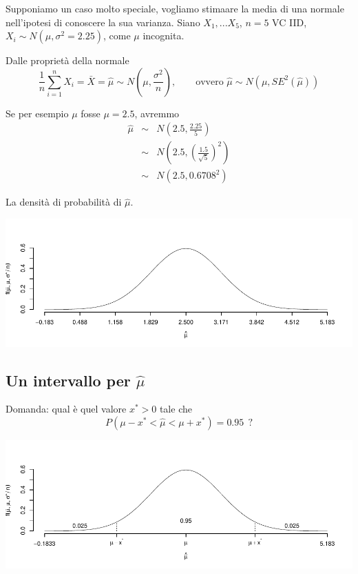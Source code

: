 \documentclass[
  11pt,
]{book}
\theoremstyle{mytheoremstyle}
\theoremstyle{mydefstyle}
\begin{document}
Supponiamo un caso molto speciale, vogliamo stimaare la media di una normale nell'ipotesi di conoscere la sua varianza. Siano \(X_1,...X_5\), \(n=5\) VC IID, \(X_i\sim N(\mu,\sigma^2=2.25)\), come \(\mu\) incognita.

Dalle proprietà della normale
\[\frac 1 n \sum_{i=1}^n X_i=\bar X=\hat\mu\sim N\left(\mu,\frac{\sigma^2}{n}\right), \qquad\text{ovvero }\hat \mu\sim N\left(\mu,SE^2(\hat \mu)\right) \]

Se per esempio \(\mu\) fosse \(\mu=2.5\), avremmo
\begin{eqnarray*}
\hat \mu &\sim& N\left(2.5,\frac{2.25}{5}\right)\\
       &\sim& N\left(2.5,\left(\frac{1.5}{\sqrt{5}}\right)^2\right)\\
       &\sim& N\left(2.5,0.6708^2\right)
\end{eqnarray*}

La densità di probabilità di \(\hat \mu\).

\begin{center}\includegraphics{Appunti_di_Statistica_2025_files/figure-latex/13-stima-intervallare-3-1} \end{center}

\subsection{\texorpdfstring{Un intervallo per \(\hat \mu\)}{Un intervallo per \textbackslash hat \textbackslash mu}}\label{un-intervallo-per-hat-mu}

Domanda: qual è quel valore \(x^*>0\) tale che
\[P(\mu-x^*<\hat \mu<\mu+x^*)=0.95~~?\]

\begin{center}\includegraphics{Appunti_di_Statistica_2025_files/figure-latex/13-stima-intervallare-4-1} \end{center}
\end{document}
